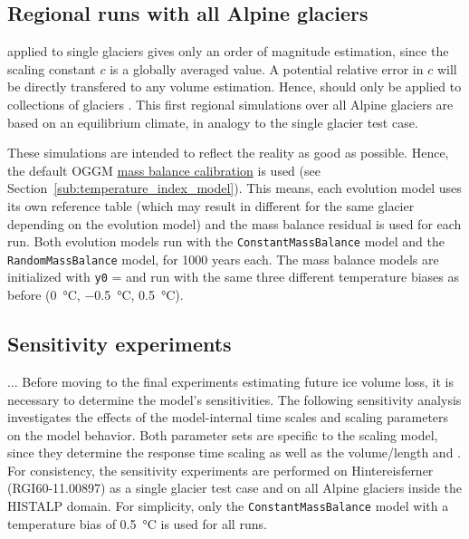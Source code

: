 
    \subsection{Regional runs with all Alpine glaciers} %
    \label{sub:regional_runs_with_all_alpine_glaciers_setup}
        \Vas{} applied to single glaciers gives only an order of magnitude estimation, since the scaling constant $c$ is a globally averaged value. A potential relative error in $c$ will be directly transfered to any volume estimation. Hence, \vas{} should only be applied to collections of glaciers \citep{Bahr2015}. 
        This first regional simulations over all Alpine glaciers are based on an equilibrium climate, in analogy to the single glacier test case.

        These simulations are intended to reflect the reality as good as possible. Hence, the default OGGM \hyperref[ssub:mb_calib]{mass balance calibration} is used (see Section~\ref{sub:temperature_index_model}). This means, each evolution model uses its own \tstar{} reference table (which may result in different \tstar{} for the same glacier depending on the evolution model) and the mass balance residual \bias{} is used for each run. Both evolution models run with the \lstinline`ConstantMassBalance` model and the \lstinline`RandomMassBalance` model, for 1000 years each. The mass balance models are initialized with \lstinline`y0` = \tstar{} and run with the same three different temperature biases as before (\SI{0}{\celsius}, \SI{-0.5}{\celsius}, \SI{+0.5}{\celsius}).
    

    \subsection{Sensitivity experiments} %
    \label{sub:sensitivity_experiments_setup}
        ... Before moving to the final experiments estimating future ice volume loss, it is necessary to determine the model's sensitivities. The following sensitivity analysis investigates the effects of the model-internal time scales and scaling parameters on the model behavior. Both parameter sets are specific to the scaling model, since they determine the response time scaling as well as the volume/length and \vas{}. For consistency, the sensitivity experiments are performed on Hintereisferner (RGI60-11.00897) as a single glacier test case and on all Alpine glaciers inside the HISTALP domain. For simplicity, only the \lstinline`ConstantMassBalance` model with a temperature bias of \SI{+0.5}{\celsius} is used for all runs.

